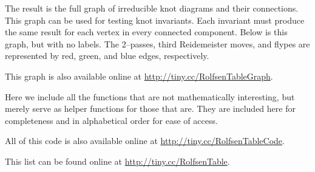 \begin{paper}

The result is the full graph of irreducible knot diagrams and their connections.
This graph can be used for testing knot invariants.
Each invariant must produce the same result for each vertex in every connected
component.
Below is this graph, but with no labels.
The 2--passes, third Reidemeister moves, and flypes are represented by red,
green, and blue edges, respectively.

\vspace{-3em}
\begin{center}\end{center}
\vspace{-3em}

This graph is also available online at \url{http://tiny.cc/RolfsenTableGraph}.


Here we include all the functions that are not mathematically interesting, but
merely serve as helper functions for those that are.
They are included here for completeness and in alphabetical order for ease of
access.

All of this code is also available online at
\url{http://tiny.cc/RolfsenTableCode}.













\end{paper}

\fontsize{12pt}{12pt}\selectfont
{}\vspace{-0.5em}


This list can be found online at \url{http://tiny.cc/RolfsenTable}.

